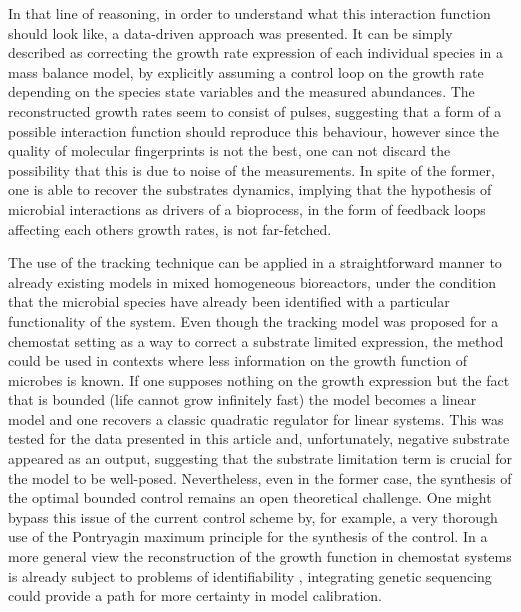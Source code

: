 \documentclass[processes,article,submit,moreauthors,pdftex]{Definitions/mdpi}
\begin{document}
In that line of reasoning, in order to understand what this interaction function should look like, a data-driven approach was presented. It can be simply described as correcting the growth rate expression of each individual species in a mass balance model, by explicitly assuming a control loop on the growth rate depending on the species state variables and the measured abundances. The reconstructed growth rates seem to consist of pulses, suggesting that a form of a possible interaction function should reproduce this behaviour, however since the quality of molecular fingerprints is not the best, one can not discard the possibility that this is due to noise of the measurements. In spite of the former, one is able to recover the substrates dynamics, implying that the hypothesis of microbial interactions as drivers of a bioprocess, in the form of feedback loops affecting each others growth rates, is not far-fetched. 

The use of the tracking technique can be applied in a straightforward manner to already existing models in mixed homogeneous bioreactors, under the condition that the microbial species have already been identified with a particular functionality of the system. Even though the tracking model was proposed for a chemostat setting as a way to correct a substrate limited expression, the method could be used in contexts where less information on the growth function of microbes is known. If one supposes nothing on the growth expression but the fact that is bounded (life cannot grow infinitely fast) the model becomes a linear model and one recovers a classic quadratic regulator for linear systems. This was tested for the data presented in this article and, unfortunately, negative substrate appeared as an output, suggesting that the substrate limitation term is crucial for the model to be well-posed. Nevertheless, even in the former case, the synthesis of the optimal bounded control remains an open theoretical challenge. One might bypass this issue of the current control scheme by, for example, a very thorough use of the Pontryagin maximum principle for the synthesis of the control. In a more general view the reconstruction of the growth function in chemostat systems is already subject to problems of identifiability \cite{Dochain2003}, integrating genetic sequencing could provide a path for more certainty in model calibration. 

\clearpage
\vspace{6pt} 
\end{document}
